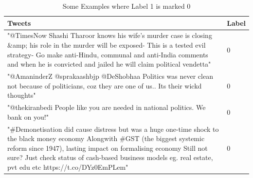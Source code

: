 \documentclass[a4paper,11pt]{article}
\begin{document}
\begin{table}[!htbp]
\caption{Some Examples where Label 1 is marked 0}
\centering
\begin{tabular}{ | p{12.25cm} | p{1cm}|} 
\hline
 Tweets & Label \\
 \hline \hline
 
"@TimesNow Shashi Tharoor knows his wife's murder case is closing \&amp; his role in the murder will be exposed- This is a tested evil strategy- Go make anti-Hindu, communal and anti-India comments and when he is convicted and jailed he will claim political vendetta" & 0 \\
\hline
 
 "@AmaninderZ @sprakaashbjp @DeShobhaa Politics was never clean not because of politicians, coz they are one of us.. Its their wickd thoughts" & 0 \\ 
 \hline
 "@thekiranbedi People like you are needed in national politics. We bank on you!" & 0 \\  
\hline

"\#Demonetisation did cause distress but was a huge one-time shock to the black money economy Alongwith \#GST (the biggest systemic reform since 1947), lasting impact on formalising economy Still not sure? Just check status of cash-based business models eg. real estate, pvt edu etc https://t.co/DYz0EmPLem" & 0 \\  
\hline

\end{tabular}
\label{tab:lab0}
\end{table}
\end{document}
